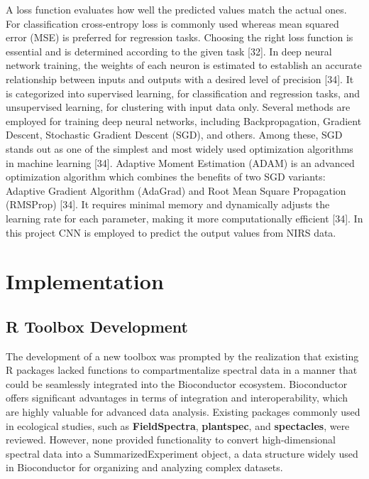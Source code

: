 \documentclass[12pt,a4paper]{article}
\begin{document}
A loss function evaluates how well the predicted values match the actual ones.  For classification cross-entropy loss is commonly used whereas mean squared error (MSE) is preferred for regression tasks. Choosing the right loss function is essential and is determined according to the given task [32]. In deep neural network training, the weights of each neuron is estimated to establish an accurate relationship between inputs and outputs with a desired level of precision [34].
It is categorized into supervised learning, for classification and regression tasks, and unsupervised learning, for clustering with input data only. Several methods are employed for training deep neural networks, including Backpropagation, Gradient Descent, Stochastic Gradient Descent (SGD), and others. Among these, SGD stands out as one of the simplest and most widely used optimization algorithms in machine learning [34]. Adaptive Moment Estimation (ADAM) is an advanced 
optimization algorithm which combines the benefits of two SGD variants: Adaptive Gradient Algorithm (AdaGrad) and Root Mean Square Propagation (RMSProp) [34]. It requires minimal memory and dynamically adjusts the learning rate for each parameter, making it more computationally efficient [34]. In this project CNN is employed to predict the output values from NIRS data. \\



\chapter{Implementation}
\section{R Toolbox Development}
The development of a new toolbox was prompted by the realization that existing R packages lacked functions to compartmentalize spectral data in a manner that could be seamlessly integrated into the Bioconductor ecosystem. Bioconductor offers significant advantages in terms of integration and interoperability, which are highly valuable for advanced data analysis. 
Existing packages commonly used in ecological studies, such as \textbf{FieldSpectra}, \textbf{plantspec}, and \textbf{spectacles}, were reviewed. However, none provided functionality to convert high-dimensional spectral data into a SummarizedExperiment object, a data structure widely used in Bioconductor for organizing and analyzing complex datasets. \\
\end{document}
